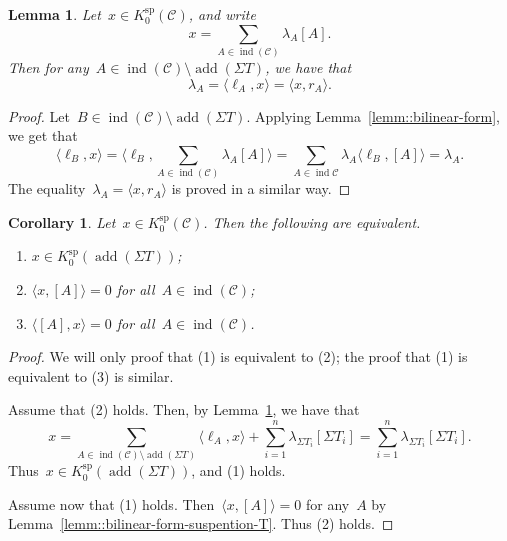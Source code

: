 \documentclass{amsart}
\newtheorem{corollary}[theorem]{Corollary}
\newtheorem{lemma}[theorem]{Lemma}
\theoremstyle{definition}
\newcommand{\cat}{\mathcal{C}}
\newcommand{\susp}{\Sigma}
\newcommand{\add}{\operatorname{add}}
\newcommand{\spl}{\operatorname{sp}}
\newcommand{\Ksp}{K_0^{\spl}}
\newcommand{\ind}{\operatorname{ind}}
\begin{document}
\begin{lemma}\label{lemm::coefficients}
 Let~$x\in \Ksp(\cat)$, and write~\[x=\sum_{A\in \ind(\cat)} \lambda_A [A].\]  Then for any~$A\in\ind(\cat)\setminus \add(\susp T)$, we have that
 \[
  \lambda_A = \langle \ell_A, x \rangle = \langle x, r_A \rangle.
 \]
\end{lemma}
\begin{proof}
 Let~$B\in \ind(\cat) \setminus \add(\susp T)$.  Applying Lemma~\ref{lemm::bilinear-form}, we get that
 \[
  \langle \ell_B, x \rangle = \langle \ell_B, \sum_{A\in \ind(\cat)} \lambda_A [A] \rangle = \sum_{A\in \ind{\cat}} \lambda_A \langle \ell_B, [A] \rangle = \lambda_A.
 \]
 The equality~$\lambda_A = \langle x, r_A\rangle$ is proved in a similar way.
\end{proof}

\begin{corollary}\label{lemm::test-susp-T}
 Let~$x\in \Ksp(\cat)$.  Then the following are equivalent.
 \begin{enumerate}
  \item $x\in \Ksp(\add(\susp T))$;
  \item $\langle x, [A]\rangle = 0$ for all~$A\in \ind(\cat)$;
  \item $\langle [A], x \rangle = 0$ for all~$A\in \ind(\cat)$.
 \end{enumerate}
\end{corollary}
\begin{proof}
 We will only proof that (1) is equivalent to (2); the proof that (1) is equivalent to (3) is similar.  
 
 Assume that (2) holds.  Then, by Lemma~\ref{lemm::coefficients}, we have that
 \[
  x = \sum_{A\in \ind(\cat)\setminus \add(\susp T)} \langle \ell_A, x \rangle + \sum_{i=1}^n \lambda_{\susp T_i} [\susp T_i] = \sum_{i=1}^n \lambda_{\susp T_i} [\susp T_i].
 \]
 Thus~$x\in \Ksp(\add(\susp T))$, and (1) holds.
 
 Assume now that (1) holds.  Then~$\langle x, [A]\rangle = 0$ for any~$A$ by Lemma~\ref{lemm::bilinear-form-suspention-T}.  Thus (2) holds.
\end{proof}
\end{document}
